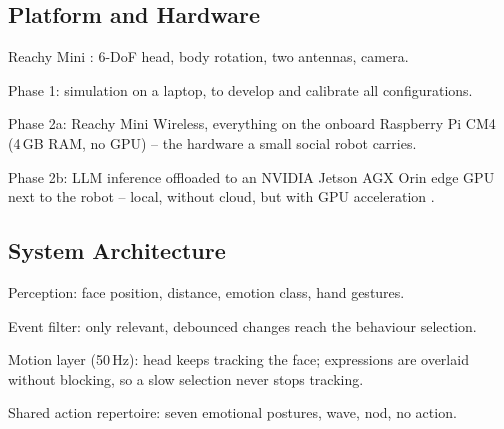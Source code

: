 \documentclass[conference]{IEEEtran}
\begin{document}
\subsection{Platform and Hardware}
\begin{points}
    \item Reachy Mini \cite{Rogel2026Reachy}: 6-DoF head, body rotation, two antennas, camera.
    \item Phase 1: simulation on a laptop, to develop and calibrate all configurations.
    \item Phase 2a: Reachy Mini Wireless, everything on the onboard Raspberry Pi CM4 (4\,GB RAM, no GPU) -- the hardware a small social robot carries.
    \item Phase 2b: LLM inference offloaded to an NVIDIA Jetson AGX Orin edge GPU next to the robot -- local, without cloud, but with GPU acceleration \cite{Abstreiter2025Edge}.
\end{points}

\subsection{System Architecture}
\begin{points}
    \item Perception: face position, distance, emotion class, hand gestures.
    \item Event filter: only relevant, debounced changes reach the behaviour selection.
    \item Motion layer (50\,Hz): head keeps tracking the face; expressions are overlaid without blocking, so a slow selection never stops tracking.
    \item Shared action repertoire: seven emotional postures, wave, nod, no action.
\end{points}
\end{document}
